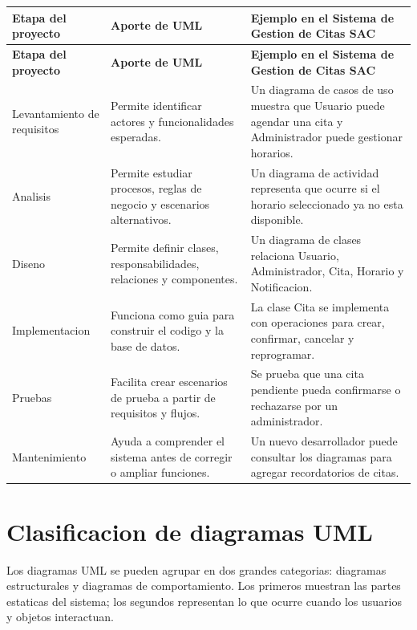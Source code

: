 \documentclass[12pt,letterpaper]{article}
\begin{document}
\begin{longtable}{|p{3.5cm}|p{5cm}|p{6.6cm}|}
\hline
\textbf{Etapa del proyecto} & \textbf{Aporte de UML} & \textbf{Ejemplo en el Sistema de Gestion de Citas SAC} \\
\hline
\endfirsthead
\hline
\textbf{Etapa del proyecto} & \textbf{Aporte de UML} & \textbf{Ejemplo en el Sistema de Gestion de Citas SAC} \\
\hline
\endhead
\hline
\endfoot
\hline
\endlastfoot

Levantamiento de requisitos & Permite identificar actores y funcionalidades esperadas. & Un diagrama de casos de uso muestra que Usuario puede agendar una cita y Administrador puede gestionar horarios. \\
\hline

Analisis & Permite estudiar procesos, reglas de negocio y escenarios alternativos. & Un diagrama de actividad representa que ocurre si el horario seleccionado ya no esta disponible. \\
\hline

Diseno & Permite definir clases, responsabilidades, relaciones y componentes. & Un diagrama de clases relaciona Usuario, Administrador, Cita, Horario y Notificacion. \\
\hline

Implementacion & Funciona como guia para construir el codigo y la base de datos. & La clase Cita se implementa con operaciones para crear, confirmar, cancelar y reprogramar. \\
\hline

Pruebas & Facilita crear escenarios de prueba a partir de requisitos y flujos. & Se prueba que una cita pendiente pueda confirmarse o rechazarse por un administrador. \\
\hline

Mantenimiento & Ayuda a comprender el sistema antes de corregir o ampliar funciones. & Un nuevo desarrollador puede consultar los diagramas para agregar recordatorios de citas. \\
\hline
\end{longtable}

\section{Clasificacion de diagramas UML}

Los diagramas UML se pueden agrupar en dos grandes categorias: diagramas estructurales y diagramas de comportamiento. Los primeros muestran las partes estaticas del sistema; los segundos representan lo que ocurre cuando los usuarios y objetos interactuan.
\end{document}
